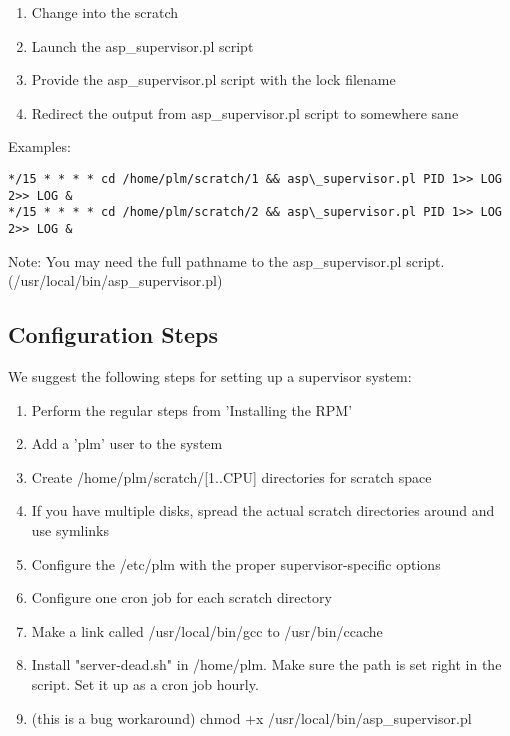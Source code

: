 \begin{enumerate}
\item Change into the scratch
\item Launch the asp\_supervisor.pl script
\item Provide the asp\_supervisor.pl script with the lock filename
\item Redirect the output from asp\_supervisor.pl script to somewhere sane
\end{enumerate}

Examples:
\begin{verbatim}
*/15 * * * * cd /home/plm/scratch/1 && asp\_supervisor.pl PID 1>> LOG 2>> LOG &
*/15 * * * * cd /home/plm/scratch/2 && asp\_supervisor.pl PID 1>> LOG 2>> LOG &
\end{verbatim}

Note: You may need the full pathname to the asp\_supervisor.pl script.  
(/usr/local/bin/asp\_supervisor.pl)

\subsection{Configuration Steps}
We suggest the following steps for setting up a supervisor system:
\begin{enumerate}
\item Perform the regular steps from 'Installing the RPM'
\item Add a 'plm' user to the system
\item Create /home/plm/scratch/[1..CPU] directories for scratch space
\item If you have multiple disks, spread the actual scratch directories around and use symlinks
\item Configure the /etc/plm with the proper supervisor-specific options
\item Configure one cron job for each scratch directory
\item Make a link called /usr/local/bin/gcc to /usr/bin/ccache
\item Install "server-dead.sh" in /home/plm.  Make sure the path is set right in the script.  Set it up as a cron job hourly.
\item (this is a bug workaround) chmod +x /usr/local/bin/asp\_supervisor.pl
\end{enumerate}
